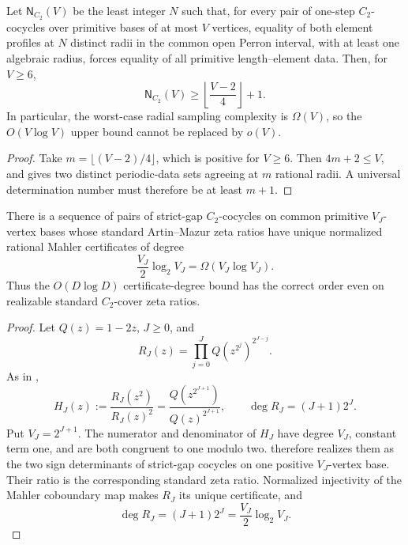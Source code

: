 \begin{corollary}
\label{cor:linear-radial-sampling-lower-bound}
Let \(\mathsf N_{C_2}(V)\) be the least integer \(N\) such that, for every
pair of one-step \(C_2\)-cocycles over primitive bases of at most \(V\)
vertices, equality of both element profiles at \(N\) distinct radii in the
common open Perron interval, with at least one algebraic radius, forces
equality of all primitive length--element data.  Then, for \(V\ge6\),
\begin{equation}\label{eq:linear-radial-sampling-lower-bound}
 \mathsf N_{C_2}(V)\ge
 \left\lfloor\frac{V-2}{4}\right\rfloor+1.
\end{equation}
In particular, the worst-case radial sampling complexity is
\(\Omega(V)\), so the \(O(V\log V)\) upper bound cannot be replaced by
\(o(V)\).
\end{corollary}

\begin{proof}
Take \(m=\lfloor(V-2)/4\rfloor\), which is positive for \(V\ge6\).
Then \(4m+2\le V\), and
 gives two distinct periodic-data
sets agreeing at \(m\) rational radii.  A universal determination number must
therefore be at least \(m+1\).
\end{proof}

\begin{corollary}
\label{cor:realizable-logarithmic-certificate-sharpness}
There is a sequence of pairs of strict-gap \(C_2\)-cocycles on common
primitive \(V_J\)-vertex bases whose standard Artin--Mazur zeta ratios have
unique normalized rational Mahler certificates of degree
\[
 \frac{V_J}{2}\log_2V_J=\Omega(V_J\log V_J).
\]
Thus the \(O(D\log D)\) certificate-degree bound has the correct order even
on realizable standard \(C_2\)-cover zeta ratios.
\end{corollary}

\begin{proof}
Let \(Q(z)=1-2z\), \(J\ge0\), and
\[
 R_J(z)=\prod_{j=0}^JQ(z^{2^j})^{2^{J-j}}.
\]
As in ,
\[
 H_J(z):=\frac{R_J(z^2)}{R_J(z)^2}
 =\frac{Q(z^{2^{J+1}})}{Q(z)^{2^{J+1}}},
 \qquad
 \deg R_J=(J+1)2^J.
\]
Put \(V_J=2^{J+1}\).  The numerator and denominator of \(H_J\) have degree
\(V_J\), constant term one, and are both congruent to one modulo two.
 therefore realizes them as
the two sign determinants of strict-gap cocycles on one positive
\(V_J\)-vertex base.  Their ratio is the corresponding standard zeta ratio.
Normalized injectivity of the Mahler coboundary map makes \(R_J\) its unique
certificate, and
\[
 \deg R_J=(J+1)2^J=\frac{V_J}{2}\log_2V_J.
\]
\end{proof}

